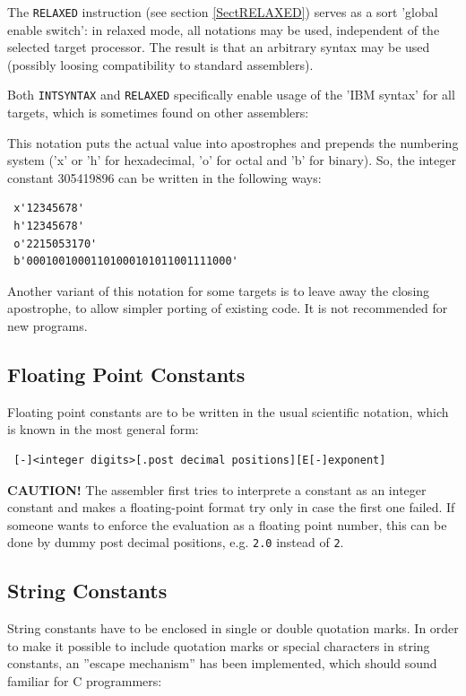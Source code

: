 \documentclass[12pt,twoside]{report}
\newcommand{\bb}[1]{{\bf #1}}
\newcommand{\tty}[1]{{\tt #1}}
\begin{document}
The \tty{RELAXED} instruction (see section \ref{SectRELAXED}) serves as
a sort 'global enable switch': in relaxed mode, all notations may be used,
independent of the selected target processor.  The result is that an arbitrary
syntax may be used (possibly loosing compatibility to standard assemblers).

Both \tty{INTSYNTAX} and \tty{RELAXED} specifically enable usage of the
'IBM syntax' for all targets, which is sometimes found on other assemblers:

This notation puts the actual value into apostrophes and prepends
the numbering system ('x' or 'h' for hexadecimal, 'o' for octal and 'b'
for binary).  So, the integer constant 305419896 can be written in the
following ways:
\begin{verbatim}
 x'12345678'
 h'12345678'
 o'2215053170'
 b'00010010001101000101011001111000'
\end{verbatim}
Another variant of this notation for some targets is to leave away the
closing apostrophe, to allow simpler porting of existing code.  It is
not recommended for new programs.

\subsection{Floating Point Constants}

Floating point constants are to be written in the usual scientific
notation, which is known in the most general form:
\begin{verbatim}
 [-]<integer digits>[.post decimal positions][E[-]exponent]
\end{verbatim}
\bb{CAUTION!} The assembler first tries to interprete a constant as an
integer constant and makes a floating-point format try only in case
the first one failed.  If someone wants to enforce the evaluation as
a floating point number, this can be done by dummy post decimal
positions, e.g.  \tty{2.0} instead of \tty{2}.

\subsection{String Constants}
\label{SectStringConsts}

String constants have to be enclosed in single or double quotation marks.
In order to make it possible to include quotation marks or special characters
in string constants, an ''escape mechanism'' has been implemented, which
should sound familiar for C programmers:
\end{document}
